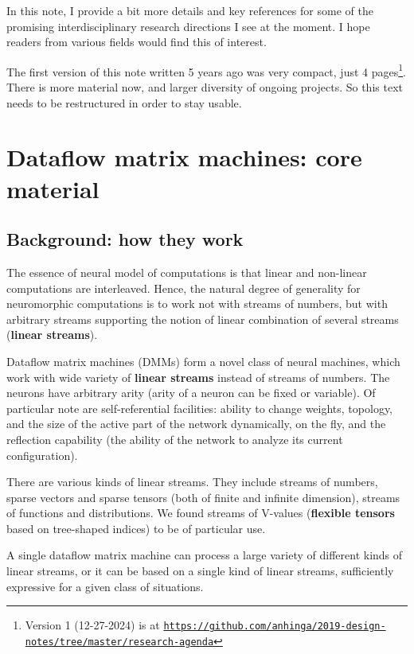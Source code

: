 \documentclass{article}
\begin{document}
In this note, I provide a bit more details and key references for some of the promising
interdisciplinary research directions I see at the moment. I hope readers from various
fields would find this of interest.

The first version of this note written 5 years ago was very compact, just 4 
pages\footnote{Version 1 (12-27-2024) is at \href{https://github.com/anhinga/2019-design-notes/tree/master/research-agenda}
{\tt https://github.com/anhinga/2019-design-notes/tree/master/research-agenda}}. 
There is more material now, and larger diversity of ongoing projects. So this text needs to be
restructured in order to stay usable.

\vspace{-0.2in}

\tableofcontents

\section{Dataflow matrix machines: core material}

\subsection{Background: how they work}

The essence of neural model of computations is that linear and non-linear computations are interleaved. Hence, the natural
degree of generality for neuromorphic computations is to work not with streams of numbers, but with arbitrary streams
supporting the notion of linear combination of several streams ({\bf linear streams}).

Dataflow matrix machines (DMMs) form a novel class of neural machines, which work with wide variety
of {\bf linear streams} instead of streams of numbers. The neurons have
arbitrary arity (arity of a neuron can be fixed or variable). Of particular note are
self-referential facilities: ability to change weights, topology, and the size of the active part of the network dynamically, on the fly,
and the reflection capability (the ability of the network to analyze its current configuration).

There are various kinds of linear streams. They include streams of numbers, sparse vectors and sparse tensors (both of
finite and infinite dimension), streams of functions and distributions. We found streams of V-values
({\bf flexible tensors} based on tree-shaped indices) to be of particular use.

A single dataflow matrix machine can process a large variety of different kinds of linear streams, or
it can be based on a single kind of linear streams, sufficiently expressive for a given class of situations.
\end{document}
